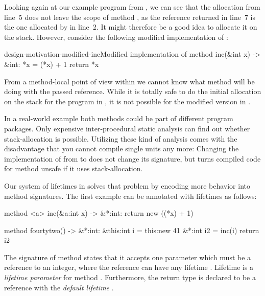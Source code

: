 Looking again at our example program from , we can see that the allocation from line~5 does not leave the scope of method , as the reference returned in line~7 is the one allocated by  in line~2.
It might therefore be a good idea to allocate it on the stack.
However, consider the following modified implementation of :

\begin{whileycodec}{design-motivation-modified-inc}{Modified implementation of }
method inc(&int x) -> &int:
	*x = (*x) + 1
	return *x
\end{whileycodec}

From a method-local point of view within  we cannot know what method  will be doing with the passed reference.
While it is totally safe to do the initial allocation on the stack for the program in , it is not possible for the modified version in .

In a real-world example both methods could be part of different program packages.
Only expensive inter-procedural static analysis can find out whether stack-allocation is possible.
Utilizing these kind of analysis comes with the disadvantage that you cannot compile single units any more: Changing the implementation of  from  to  does not change its signature, but turns compiled code for method  unsafe if it uses stack-allocation.

Our system of lifetimes in \whiley solves that problem by encoding more behavior into method signatures.
The first example can be annotated with lifetimes as follows:

\begin{whileycode}
method <a> inc(&a:int x) -> &*:int:
	return new ((*x) + 1)

method fourtytwo() -> &*:int:
	&this:int i = this:new 41
	&*:int i2 = inc(i)
	return i2
\end{whileycode}


The signature of method  states that it accepts one parameter which must be a reference to an integer, where the reference can have any lifetime .
Lifetime  is a \emph{lifetime parameter} for method .
Furthermore, the return type is declared to be a reference with the \emph{default lifetime} \whileyinline{*}.

